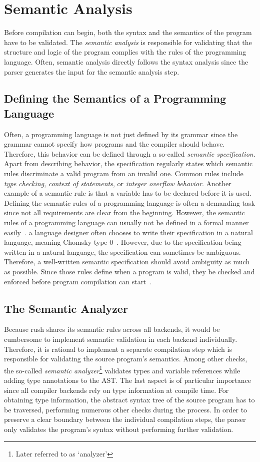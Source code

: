 \section{Semantic Analysis}
Before compilation can begin, both the syntax and the semantics of the program have to be validated.
The \emph{semantic analysis} is responsible for validating that the structure and logic of the program complies with the rules of the programming language.
Often, semantic analysis directly follows the syntax analysis since the parser generates the input for the semantic analysis step.

\subsection{Defining the Semantics of a Programming Language}
Often, a programming language is not just defined by its grammar
since the grammar cannot specify how programs and the compiler should behave.
Therefore, this behavior can be defined through a so-called \emph{semantic specification}.
Apart from describing behavior, the specification regularly states which semantic rules discriminate a valid program from an invalid one.
Common rules include \emph{type checking}, \emph{context of statements}, or \emph{integer overflow behavior}.
Another example of a semantic rule is that a variable has to be declared before it is used.
Defining the semantic rules of a programming language is often a demanding task
since not all requirements are clear from the beginning.
However, the semantic rules of a programming language can usually not be defined in a formal manner easily~\cite[pp.~5f]{Holm2012}.
a language designer often chooses to write their specification in a natural language, meaning Chomsky type 0~\cite[p.~23]{Watson2017}.
However, due to the specification being written in a natural language, the specification can sometimes be ambiguous.
Therefore, a well-written semantic specification should avoid ambiguity as much as possible.
Since those rules define when a program is valid, they be checked and enforced before program compilation can start~\cite[p.~21]{Watson2017}.

\subsection{The Semantic Analyzer}
Because rush shares its semantic rules across all backends,
it would be cumbersome to implement semantic validation in each
backend individually. Therefore, it is rational to implement a separate
compilation step which is responsible for validating the source program's semantics.
Among other checks, the so-called \emph{semantic analyzer}\footnote{Later referred to as `analyzer'} validates types
and variable references while adding type annotations to the AST. The last aspect is
of particular importance since all compiler backends rely on type information at
compile time. For obtaining type information, the abstract syntax
tree of the source program has to be traversed, performing numerous other checks
during the process. In order to preserve a clear boundary between the individual compilation steps, the parser
only validates the program's syntax without performing further validation.

